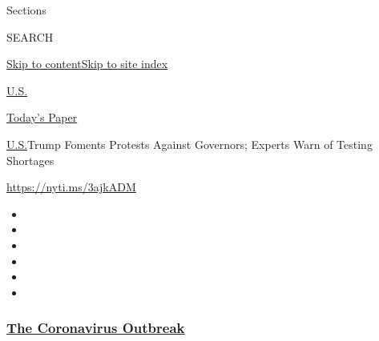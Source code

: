 Sections

SEARCH

\protect\hyperlink{site-content}{Skip to
content}\protect\hyperlink{site-index}{Skip to site index}

\href{https://www.nytimes3xbfgragh.onion/section/us}{U.S.}

\href{https://myaccount.nytimes3xbfgragh.onion/auth/login?response_type=cookie\&client_id=vi}{}

\href{https://www.nytimes3xbfgragh.onion/section/todayspaper}{Today's
Paper}

\href{/section/us}{U.S.}\textbar{}Trump Foments Protests Against
Governors; Experts Warn of Testing Shortages

\url{https://nyti.ms/3ajkADM}

\begin{itemize}
\item
\item
\item
\item
\item
\item
\end{itemize}

\hypertarget{the-coronavirus-outbreak}{%
\subsubsection{\texorpdfstring{\href{https://www.nytimes3xbfgragh.onion/news-event/coronavirus?name=styln-coronavirus-national\&region=TOP_BANNER\&block=storyline_menu_recirc\&action=click\&pgtype=Article\&impression_id=fddebdb0-f1d6-11ea-8367-83b45a6aab78\&variant=undefined}{The
Coronavirus
Outbreak}}{The Coronavirus Outbreak}}\label{the-coronavirus-outbreak}}


